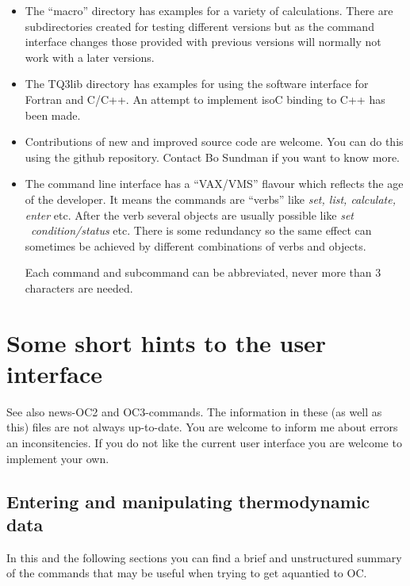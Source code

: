 \documentclass[12pt]{article}
\begin{document}
\begin{itemize}
\item The ``macro'' directory has examples for a variety of
  calculations.  There are subdirectories created for testing
  different versions but as the command interface changes those
  provided with previous versions will normally not work with a later
  versions.

\item The TQ3lib directory has examples for using the software
  interface for Fortran and C/C++.  An attempt to implement isoC
  binding to C++ has been made.

\item Contributions of new and improved source code are welcome.  You
  can do this using the github repository.  Contact Bo Sundman if you
  want to know more.

\item The command line interface has a ``VAX/VMS'' flavour which
  reflects the age of the developer.  It means the commands are
  ``verbs'' like {\em set, list, calculate, enter} etc.  After the
  verb several objects are usually possible like {\em
    set ~condition/status} etc.  There is some redundancy so the same
  effect can sometimes be achieved by different combinations of verbs
  and objects.

  Each command and subcommand can be abbreviated, never more than 3
  characters are needed.

\end{itemize}

\section{Some short hints to the user interface}

See also news-OC2 and OC3-commands.  The information in these (as well
as this) files are not always up-to-date.  You are welcome to inform me
about errors an inconsitencies.  If you do not like the current user
interface you are welcome to implement your own.

\subsection{Entering and manipulating thermodynamic data}

In this and the following sections you can find a brief and
unstructured summary of the commands that may be useful when trying to
get aquantied to OC.
\end{document}
